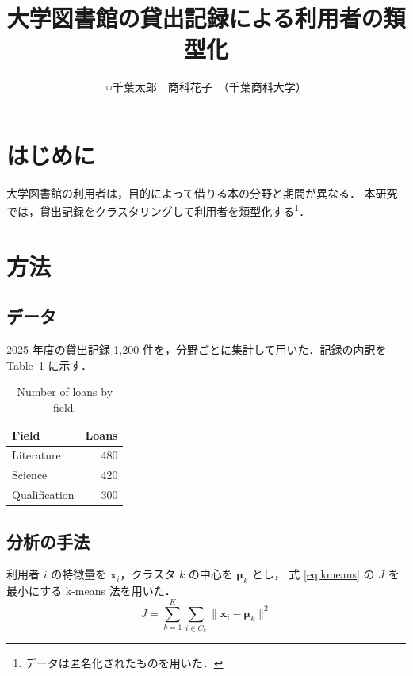 \documentclass{jarticle}
\begin{document}
\title{大学図書館の貸出記録による利用者の類型化}
\author{○千葉太郎\ \ 商科花子\ （千葉商科大学）}

\maketitle\thispagestyle{empty}
\pagestyle{empty}

\section{はじめに}

大学図書館の利用者は，目的によって借りる本の分野と期間が異なる\cite{tanaka2020}．
本研究では，貸出記録をクラスタリングして利用者を類型化する\footnote{データは匿名化されたものを用いた．}．

\section{方法}

\subsection{データ}

2025 年度の貸出記録 1,200 件を，分野ごとに集計して用いた\cite{suzuki2018}．記録の内訳を Table~\ref{tab:data} に示す．

\begin{table}[t]
  \centering
  \caption{Number of loans by field.}
  \label{tab:data}
  \begin{tabular}{lr}
    \hline
    Field & Loans \\
    \hline
    Literature & 480 \\
    Science & 420 \\
    Qualification & 300 \\
    \hline
  \end{tabular}
\end{table}

\subsection{分析の手法}

利用者 $i$ の特徴量を $\boldsymbol{x}_i$，クラスタ $k$ の中心を $\boldsymbol{\mu}_k$ とし，
式 \eqref{eq:kmeans} の $J$ を最小にする k-means 法\cite{macqueen1967}を用いた．
\begin{equation}
  J = \sum_{k=1}^{K} \sum_{i \in C_k} \| \boldsymbol{x}_i - \boldsymbol{\mu}_k \|^2
  \label{eq:kmeans}
\end{equation}
\end{document}
